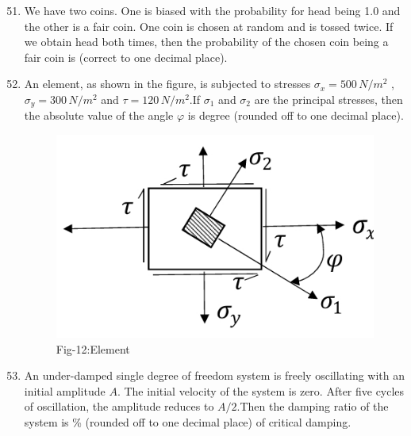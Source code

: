 \documentclass[journal]{IEEEtran}
\theoremstyle{remark}
\begin{document}
\begin{enumerate}[itemsep=1em]
\setcounter{enumi}{50}
\item We have two coins. One is biased with the probability for head being 1.0 and the other is a fair coin.  One coin is chosen at random and is tossed twice. If we obtain head both times, then the probability of the chosen coin being a fair coin is \underline{\hspace{1cm}} (correct to one decimal place). 
\end{enumerate}

\begin{enumerate}[itemsep=1em]
\setcounter{enumi}{51}
\item An element, as shown in the figure, is subjected to stresses $\sigma_x= 500\,N/m^2$ , $\sigma_y=300\,N/m^2$ and $\tau=120\,N/m^2$.If $\sigma_1$ and $\sigma_2$ are the principal stresses, then the absolute value of the angle $\varphi$ is \underline{\hspace{1cm}} degree (rounded off to one decimal place).
\begin{figure}[H]
    \centering
    \includegraphics[width=0.4\columnwidth]{figs/fig-12.jpeg}
    \caption*{Fig-12:Element}
    \label{fig-12}
\end{figure}

\end{enumerate}

\begin{enumerate}[itemsep=1em]
\setcounter{enumi}{52}
\item An under-damped single degree of freedom system is freely oscillating with an initial amplitude $A$. The initial velocity of the system is zero.  After five cycles of oscillation, the amplitude reduces to $A/2$.Then the damping ratio of the system is \underline{\hspace{1cm}} \% (rounded off to one decimal place) of critical damping. 
\end{enumerate}
\end{document}
